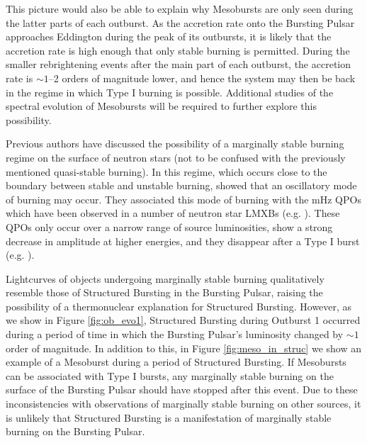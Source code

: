 \par This picture would also be able to explain why Mesobursts are only seen during the latter parts of each outburst.  As the accretion rate onto the Bursting Pulsar approaches Eddington during the peak of its outbursts, it is likely that the accretion rate is high enough that only stable burning is permitted.  During the smaller rebrightening events after the main part of each outburst, the accretion rate is $\sim1$--2 orders of magnitude lower, and hence the system may then be back in the regime in which Type I burning is possible.  Additional studies of the spectral evolution of Mesobursts will be required to further explore this possibility.
\par Previous authors have discussed the possibility of a marginally stable burning regime on the surface of neutron stars (not to be confused with the previously mentioned quasi-stable burning).  In this regime, which occurs close to the boundary between stable and unstable burning, \citet{Heger_MargStab} showed that an oscillatory mode of burning may occur.  They associated this mode of burning with the mHz QPOs which have been observed in a number of neutron star LMXBs (e.g. \citealp{Revnivtsev_MargStab,Altamirano_MargStab}).  These QPOs only occur over a narrow range of source luminosities, show a strong decrease in amplitude at higher energies, and they disappear after a Type I burst (e.g. \citealp{Altamirano_MargStab}).
\par Lightcurves of objects undergoing marginally stable burning qualitatively resemble those of Structured Bursting in the Bursting Pulsar, raising the possibility of a thermonuclear explanation for Structured Bursting.  However, as we show in Figure \ref{fig:ob_evo1}, Structured Bursting during Outburst 1 occurred during a period of time in which the Bursting Pulsar's luminosity changed by $\sim1$ order of magnitude.  In addition to this, in Figure \ref{fig:meso_in_struc} we show an example of a Mesoburst during a period of Structured Bursting.  If Mesobursts can be associated with Type I bursts, any marginally stable burning on the surface of the Bursting Pulsar should have stopped after this event.  Due to these inconsistencies with observations of marginally stable burning on other sources, it is unlikely that Structured Bursting is a manifestation of marginally stable burning on the Bursting Pulsar.
